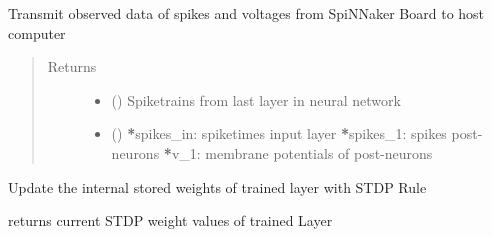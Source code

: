 \documentclass[letterpaper,10pt,english]{sphinxmanual}
\begin{document}
\begin{fulllineitems}
\begin{fulllineitems}
\label{\detokenize{SpikingConvNet:SpikingConvNet.classes.Spinnaker_Network.print_parameters}}
\end{fulllineitems}


\begin{fulllineitems}
\label{\detokenize{SpikingConvNet:SpikingConvNet.classes.Spinnaker_Network.retrieve_data}}
Transmit observed data of spikes and voltages from SpiNNaker Board
to host computer
\begin{quote}\begin{description}
\item[{Returns}] \leavevmode
\begin{itemize}
\item {} 
 () \textendash{} Spiketrains from last layer in neural network

\item {} 
 () \textendash{} {\color{red}\bfseries{}*}spikes\_in: spiketimes input layer
{\color{red}\bfseries{}*}spikes\_1: spikes post-neurons
{\color{red}\bfseries{}*}v\_1: membrane potentials of post-neurons

\end{itemize}


\end{description}\end{quote}

\end{fulllineitems}


\begin{fulllineitems}
\label{\detokenize{SpikingConvNet:SpikingConvNet.classes.Spinnaker_Network.update_kernel_weights}}
Update the internal stored weights of trained layer with STDP Rule

returns current STDP weight values of trained Layer

\end{fulllineitems}


\end{fulllineitems}
\end{document}
